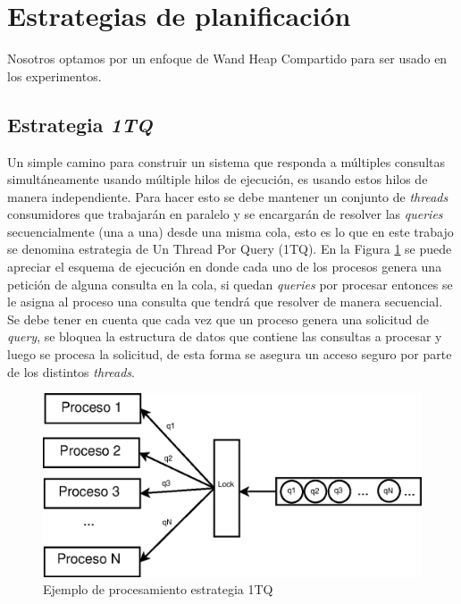 \section{Estrategias de planificación}
\label{scheduling:es}

Nosotros optamos por un enfoque de Wand Heap Compartido para ser usado en los experimentos.


\subsection{Estrategia \textit{1TQ}}
\label{scheduling:baseline}
Un simple camino para construir un sistema que responda a múltiples consultas simultáneamente usando múltiple hilos de ejecución, es usando estos hilos de manera independiente. Para hacer esto se debe mantener un conjunto de \textit{threads} consumidores que trabajarán en paralelo y se encargarán de resolver las \textit{queries} secuencialmente (una a una) desde una misma cola, esto es lo que en este trabajo se denomina estrategia de Un Thread Por Query (1TQ). En la Figura \ref{fig:1TQ} se puede apreciar el esquema de ejecución en donde cada uno de los procesos genera una petición de alguna consulta en la cola, si quedan \textit{queries} por procesar entonces se le asigna al proceso una consulta que tendrá que resolver de manera secuencial. Se debe tener en cuenta que cada vez que un proceso genera una solicitud de \textit{query}, se bloquea la estructura de datos que contiene las consultas a procesar y luego se procesa la solicitud, de esta forma se asegura un acceso seguro por parte de los distintos \textit{threads}. 

\begin{figure}[H]
\centering
\includegraphics[scale=.75]{images/1TQ.eps}
\caption{Ejemplo de procesamiento estrategia 1TQ}
\label{fig:1TQ}
\end{figure}

